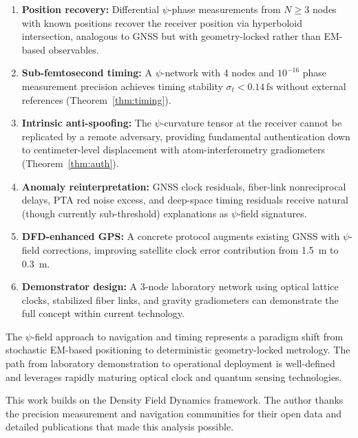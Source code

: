 \documentclass[aps,prd,twocolumn,superscriptaddress,nofootinbib]{revtex4-2}
\newcommand{\fs}{\,\mathrm{fs}}
\begin{document}
\begin{enumerate}
\item \textbf{Position recovery:} Differential $\psi$-phase measurements
from $N \geq 3$ nodes with known positions recover the receiver position
via hyperboloid intersection, analogous to GNSS but with
geometry-locked rather than EM-based observables.

\item \textbf{Sub-femtosecond timing:} A $\psi$-network with 4 nodes
and $10^{-16}$ phase measurement precision achieves timing stability
$\sigma_t < 0.14\fs$ without external references
(Theorem~\ref{thm:timing}).

\item \textbf{Intrinsic anti-spoofing:} The $\psi$-curvature tensor
at the receiver cannot be replicated by a remote adversary, providing
fundamental authentication down to centimeter-level displacement
with atom-interferometry gradiometers (Theorem~\ref{thm:auth}).

\item \textbf{Anomaly reinterpretation:} GNSS clock residuals,
fiber-link nonreciprocal delays, PTA red noise excess, and deep-space
timing residuals receive natural (though currently sub-threshold)
explanations as $\psi$-field signatures.

\item \textbf{DFD-enhanced GPS:} A concrete protocol augments
existing GNSS with $\psi$-field corrections, improving satellite clock
error contribution from 1.5~m to 0.3~m.

\item \textbf{Demonstrator design:} A 3-node laboratory network
using optical lattice clocks, stabilized fiber links, and gravity
gradiometers can demonstrate the full concept within current
technology.
\end{enumerate}

The $\psi$-field approach to navigation and timing represents a
paradigm shift from stochastic EM-based positioning to deterministic
geometry-locked metrology. The path from laboratory demonstration to
operational deployment is well-defined and leverages rapidly maturing
optical clock and quantum sensing technologies.

\begin{acknowledgments}
This work builds on the Density Field Dynamics framework. The
author thanks the precision measurement and navigation communities
for their open data and detailed publications that made this
analysis possible.
\end{acknowledgments}
\end{document}
